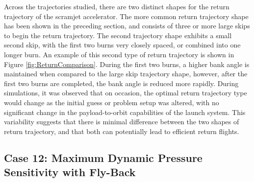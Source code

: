 Across the trajectories studied, there are two distinct shapes for the return trajectory of the scramjet accelerator. The more common return trajectory shape has been shown in the preceding section, and consists of three or more large skips to begin the return trajectory. The second trajectory shape exhibits a small second skip, with the first two burns very closely spaced, or combined into one longer burn. An example of this second type of return trajectory is shown in Figure \ref{fig:ReturnComparison}. During the first two burns, a higher bank angle is maintained when compared to the large skip trajectory shape, however, after the first two burns are completed, the bank angle is reduced more rapidly. 
During simulations, it was observed that on occasion, the optimal return trajectory type would change as the initial guess or problem setup was altered, with no significant change in the payload-to-orbit capabilities of the launch system. This variability suggests that there is minimal difference between the two shapes of return trajectory, and that both can potentially lead to efficient return flights. 





\subsection{Case 12: Maximum Dynamic Pressure Sensitivity with Fly-Back}

